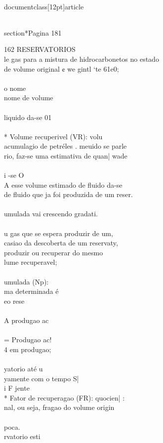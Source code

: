\\documentclass[12pt]{article}
\begin{document}
\\section*{Pagina 181}

162 RESERVATORIOS\\
le gas para a mistura de hidrocarbonetos no estado\\
de volume original ¢ we gintl ‘te 61e0;\\
\\
o nome\\
nome de volume\\
\\
liquido da-se 01\\
\\
* Volume recuperivel (VR): volu\\
acumulagio de petréles . meuido se parle\\
rio, faz-se uma estimativa de quan| wade\\
\\
i -se O\\
A esse volume estimado de fluido da-se\\
de fluido que ja foi produzida de um reser.\\
\\
umulada vai crescendo gradati.\\
\\
u gas que se espera produzir de um,\\
casiao da descoberta de um reservaty,\\
produzir ou recuperar do mesmo\\
lume recuperavel;\\
\\
umulada (Np):\\
ma determinada é\\
eo rese\\
\\
A produgao ac\\
\\
= Produgao ac!\\
4 em produgao;\\
\\
yatorio até u\\
yamente com o tempo S|\\
i F jente\\
* Fator de recuperagao (FR): quocien| :\\
nal, ou seja, fragao do volume origin\\
\\
poca.\\
rvatorio esti\\
\\
\end{document}
